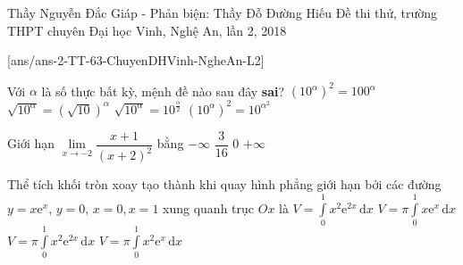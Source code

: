 \begin{name}
{Thầy Nguyễn Đắc Giáp  - Phản biện: Thầy Đỗ Đường Hiếu}
{Đề thi thử, trường THPT chuyên Đại học Vinh, Nghệ An, lần 2, 2018}
\end{name}
\setcounter{ex}{0}
[ans/ans-2-TT-63-ChuyenDHVinh-NgheAn-L2]
\begin{ex}%
	Với $\alpha $ là số thực bất kỳ, mệnh đề nào sau đây \textbf{sai}?
	\choice
	{$\left(10^{\alpha}\right)^2=100^{\alpha}$}
	{$\sqrt{10^{\alpha}}=\left(\sqrt{10}\right)^{\alpha}$}
	{$\sqrt{10^{\alpha}}=10^{\tfrac{\alpha}{2}}$}
	{\True $\left(10^{\alpha}\right)^2=10^{\alpha^2}$}
\end{ex}
\begin{ex}%
	Giới hạn $\lim\limits_{x\to -2} \dfrac{x+1}{(x+2)^2}$ bằng
	\choice
	{\True $-\infty $}
	{$\dfrac{3}{16}$}
	{$0$}
	{$+\infty $}
\end{ex}
\begin{ex}%
	Thể tích khối tròn xoay tạo thành khi quay hình phẳng giới hạn bởi các đường $y=x\mathrm{e}^x$, $y=0$, $x=0,x=1$ xung quanh trục $Ox$ là
	\choice
	{$V=\displaystyle\int\limits_0^1 x^2\mathrm{e}^{2x} \mathrm{\,d}x$}
	{$V=\pi \displaystyle\int\limits_0^1 x\mathrm{e}^x \mathrm{\,d}x$}
	{\True $V=\pi \displaystyle\int\limits_0^1 x^2\mathrm{e}^{2x} \mathrm{\,d}x$}
	{$V=\pi \displaystyle\int\limits_0^1 x^2\mathrm{e}^x \mathrm{\,d}x$}
\end{ex}
